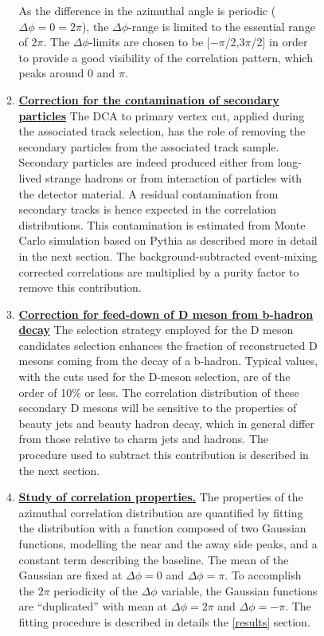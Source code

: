 \begin{enumerate}
\begin{figure}
\begin{enumerate}
As the difference in the azimuthal angle is periodic ($\Delta \phi = 0 = 2\pi$), the $\Delta\phi$-range is limited to the essential range of 2$\pi$. The $\Delta \phi$-limits are chosen to be [$-\pi$/2,3$\pi$/2] in order to provide a good visibility of the correlation pattern, which peaks around 0 and $\pi$.

\item
\underline {\bf Correction for the contamination of secondary particles}
The DCA to primary vertex cut, applied during the associated track selection, has the role of removing the secondary particles from the associated track sample.
Secondary particles are indeed produced either from long-lived strange hadrons or from interaction of particles with the detector material. A residual contamination from secondary tracks is hence expected in the correlation distributions. This contamination is estimated from Monte Carlo simulation
based on Pythia as described more in detail in the next section. The background-subtracted
event-mixing corrected correlations are multiplied by a purity factor to remove this contribution.

\item
\underline {\bf Correction for feed-down of D meson from b-hadron decay}
The selection strategy employed for the D meson candidates selection %
enhances the fraction of reconstructed D mesons coming from the decay of a b-hadron. Typical values, with the cuts used for the D-meson selection, are of the order of 10\% or less. The correlation distribution of these secondary D mesons will be sensitive to the properties of beauty jets and beauty hadron decay, which in general differ from those relative to charm jets and hadrons. The procedure used to subtract this contribution is described in the next section.

\item
\underline{\bf Study of correlation properties.}
The properties of the azimuthal correlation distribution are quantified by
fitting the distribution with a function composed of two Gaussian functions, modelling the near and the away side peaks, and
a constant term describing the baseline. The mean of the Gaussian are fixed at
$\Delta\phi = 0$ and $\Delta\phi = \pi$. To accomplish the $2\pi$ periodicity
of the $\Delta\phi$ variable, the Gaussian functions
are ``duplicated'' with mean at $\Delta\phi = 2\pi$ and $\Delta\phi = -\pi$.
The fitting procedure is described in details the \ref{results} section.



\end{enumerate}
\end{figure}
\end{enumerate}
